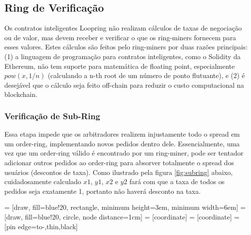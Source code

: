 \documentclass[UTF8,nofonts]{article}
\makeatletter
\newenvironment{figurehere}
 {\def\@captype{figure}}
 {}
\makeatother
\begin{document}
\begin{multicols}{2}
\subsection{Ring de Verificação\label{sec:ring_verification}}

Os contratos inteligentes Loopring não realizam cálculos de taxas de negociação ou de valor, mas devem receber e verificar o que os ring-miners fornecem para esses valores. Estes cálculos são feitos pelo ring-miners por duas razões principais: (1) a linguagem de programação para contratos inteligentes, como o Solidity \cite{dannen2017introducing} da Ethereum, não tem suporte para matemática de floating point, especialmente $pow(x, 1/n)$ (calculando a n-th root de um número de ponto flutuante), e (2) é desejável que o cálculo seja feito off-chain para reduzir o custo computacional na blockchain.


\subsubsection{Verificação de Sub-Ring\label{sec:sub_ring_check}}

Essa etapa impede que os arbitradores realizem injustamente todo o spread em um order-ring, implementando novos pedidos dentro dele. Essencialmente, uma vez que um order-ring válido é encontrado por um ring-miner, pode ser tentador adicionar outros pedidos ao order-ring para absorver totalmente o spread dos usuários (descontos de taxa). Como ilustrado pela figura \ref{fig:subring} abaixo, cuidadosamente calculado $x1$, $y1$, $x2$ e $y2$ fará com que a taxa de todos os pedidos seja exatamente 1, portanto não haverá desconto na taxa.

\begin{center}
\begin{figurehere}
\centering
{} = [draw, fill=blue!20, rectangle, 
    minimum height=3em, minimum width=6em]
 = [draw, fill=blue!20, circle, node distance=1cm]
 = [coordinate]
 = [coordinate]
 = [pin edge={to-,thin,black}]

\begin{tikzpicture}[
    auto, 
    node distance=2cm,
    >=latex',
    font=\bfseries\footnotesize\sffamily,
    order/.style={
		scale=0.7,
		rectangle,
		rounded corners,
		draw=black, 
		text centered,
		minimum height=12mm,
		fill=white
	},
	label/.style={
		scale=0.7
	}
  ]


\end{tikzpicture}
\end{figurehere}
\end{center}
\end{multicols}
\end{document}
